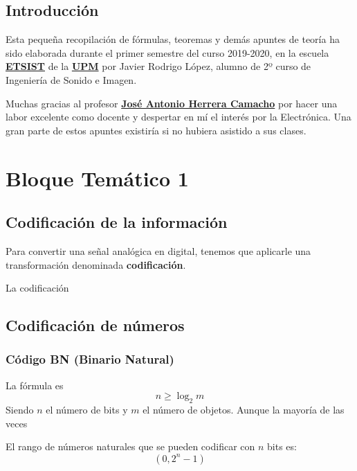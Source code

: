 \documentclass[a4paper]{book}
\begin{document}
\newpage

\setlength{\parskip}{0.5em}

\section*{Introducción}
Esta pequeña recopilación de fórmulas, teoremas y demás apuntes de teoría ha sido elaborada durante el primer semestre del curso 2019-2020, en la escuela \href{https://www.etsist.upm.es/}{\textbf{ETSIST}} de la \href{http://www.upm.es/}{\textbf{UPM}} por Javier Rodrigo López, alumno de 2º curso de Ingeniería de Sonido e Imagen.

Muchas gracias al profesor \href{https://www.euitt.upm.es/escuela/directorio?departamento=DTE&idTrabajador=c0874849914b0380a54a53f80d4d60f1}{\textbf{José Antonio Herrera Camacho}} por hacer una labor excelente como docente y despertar en mí el interés por la Electrónica. Una gran parte de estos apuntes existiría si no hubiera asistido a sus clases.
\newpage

\setlength{\parskip}{0em}
\tableofcontents
\setlength{\parskip}{0.5em}


\chapter{Bloque Temático 1}

\section{Codificación de la información}

Para convertir una señal analógica en digital, tenemos que aplicarle una transformación denominada \textbf{codificación}.

La codificación
\section{Codificación de números}
\subsection{Código BN (Binario Natural)}

La fórmula es \[n\geq \log_2{m}\]
Siendo $n$ el número de bits y $m$ el número de objetos. Aunque la mayoría de las veces

El rango de números naturales que se pueden codificar con $n$ bits es:
\[\left( 0, 2^{n}-1 \right)\]
\end{document}
